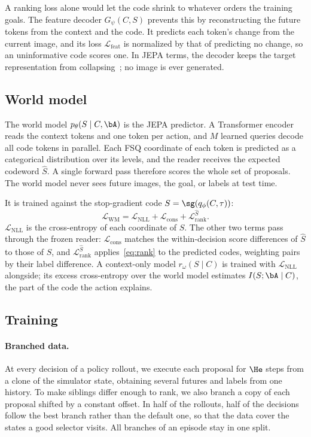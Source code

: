 A ranking loss alone would let the code shrink to whatever orders the training goals.
The feature decoder $G_\psi(C,S)$ prevents this by reconstructing the future tokens from the context and the code.
It predicts each token's change from the current image, and its loss $\mathcal{L}_{\mathrm{feat}}$ is normalized by that of predicting no change, so an uninformative code scores one.
In JEPA terms, the decoder keeps the target representation from collapsing~\cite{lecun2022path}; no image is ever generated.

\subsection{World model}
\label{sec:wm}
The world model $p_\theta(S\mid C,\bA)$ is the JEPA predictor.
A Transformer encoder reads the context tokens and one token per action, and $M$ learned queries decode all code tokens in parallel.
Each FSQ coordinate of each token is predicted as a categorical distribution over its levels, and the reader receives the expected codeword $\hat S$.
A single forward pass therefore scores the whole set of proposals.
The world model never sees future images, the goal, or labels at test time.

It is trained against the stop-gradient code $S=\sg(q_\phi(C,\tau))$:
\begin{equation}
  \mathcal{L}_{\mathrm{WM}}=\mathcal{L}_{\mathrm{NLL}}+\mathcal{L}_{\mathrm{cons}}+\mathcal{L}^{\hat S}_{\mathrm{rank}}.
  \label{eq:wm}
\end{equation}
$\mathcal{L}_{\mathrm{NLL}}$ is the cross-entropy of each coordinate of $S$.
The other two terms pass through the frozen reader: $\mathcal{L}_{\mathrm{cons}}$ matches the within-decision score differences of $\hat S$ to those of $S$, and $\mathcal{L}^{\hat S}_{\mathrm{rank}}$ applies~\eqref{eq:rank} to the predicted codes, weighting pairs by their label difference.
A context-only model $r_\omega(S\mid C)$ is trained with $\mathcal{L}_{\mathrm{NLL}}$ alongside; its excess cross-entropy over the world model estimates $I(S;\bA\mid C)$, the part of the code the action explains.

\subsection{Training}
\label{sec:codesign}
\paragraph{Branched data.}
At every decision of a policy rollout, we execute each proposal for $\He$ steps from a clone of the simulator state, obtaining several futures and labels from one history.
To make siblings differ enough to rank, we also branch a copy of each proposal shifted by a constant offset.
In half of the rollouts, half of the decisions follow the best branch rather than the default one, so that the data cover the states a good selector visits.
All branches of an episode stay in one split.

